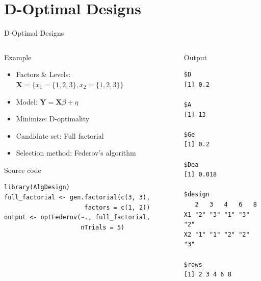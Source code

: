 \documentclass[10pt, compress, aspectratio=169, xcolor={table,usenames,dvipsnames}]{beamer}
\begin{document}
\section{D-Optimal Designs}
\label{sec:org2d9c814}
\begin{frame}[fragile,label={sec:org2ad3217}]{D-Optimal Designs}
 \begin{columns}
\begin{column}{0.5\columnwidth}
\begin{block}{Example}
\begin{itemize}
\item Factors \& Levels: \(\mathbf{X} = \{x_1 = \{1, 2, 3\}, x_2 = \{1, 2, 3\}\}\)
\item Model: \(\mathbf{Y} = \mathbf{X}\beta + \eta\)
\item Minimize: \alert{D-optimality}
\item Candidate set: \alert{Full factorial}
\item Selection method: \alert{Federov's algorithm}
\end{itemize}

\begin{block}{Source code}
\lstset{language=r,label= ,caption= ,captionpos=b,numbers=none}
\begin{lstlisting}
library(AlgDesign)
full_factorial <- gen.factorial(c(3, 3),
                      factors = c(1, 2))
output <- optFederov(~., full_factorial,
                     nTrials = 5)
\end{lstlisting}
\end{block}
\end{block}
\end{column}

\begin{column}{0.5\columnwidth}
\begin{block}{Output}
\scriptsize

\begin{verbatim}
$D
[1] 0.2

$A
[1] 13

$Ge
[1] 0.2

$Dea
[1] 0.018

$design
   2   3   4   6   8  
X1 "2" "3" "1" "3" "2"
X2 "1" "1" "2" "2" "3"

$rows
[1] 2 3 4 6 8
\end{verbatim}

\normalsize
\end{block}
\end{column}
\end{columns}
\end{frame}
\end{document}
